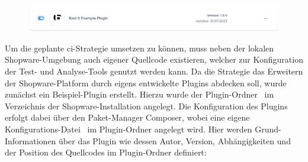 \begin{figure}[H]
    \centering
    \includegraphics[width=\textwidth]{images/content/best-it-example-plugin}
    \label{fig:example-plugin}
\end{figure}

Um die geplante \acrshort{ci}-Strategie umsetzen zu können, muss neben der lokalen Shopware-Umgebung auch eigener
Quellcode existieren, welcher zur Konfiguration der Test- und Analyse-Tools genutzt werden kann.
Da die Strategie das Erweitern der Shopware-Platform durch eigens entwickelte Plugins abdecken soll, wurde zunächst ein
Beispiel-Plugin erstellt.
Hierzu wurde der Plugin-Ordner\  im Verzeichnis 
der Shopware-Installation angelegt.
Die Konfiguration des Plugins erfolgt dabei über den Paket-Manager Composer, wobei eine eigene
Konfigurations-Datei\  im Plugin-Ordner angelegt wird.
Hier werden Grund-Informationen über das Plugin wie dessen Autor, Version, Abhängigkeiten und der Position des
Quellcodes im Plugin-Ordner definiert:


